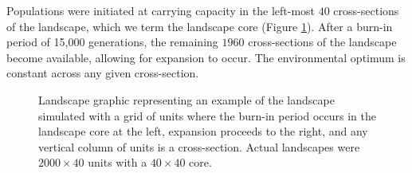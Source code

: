 
Populations were initiated at carrying capacity in the left-most $40$ cross-sections of the landscape, which we term the landscape core (Figure \ref{fig:landscape}). After a burn-in period of 15,000 generations, the remaining $1960$ cross-sections of the landscape become available, allowing for expansion to occur. The environmental optimum is constant across any given cross-section.

\begin{figure}[h]
\centering
{}
\caption[Landscape graphic.]{Landscape graphic representing an example of the landscape simulated with a grid of units where the burn-in period occurs in the landscape core at the left, expansion proceeds to the right, and any vertical column of units is a cross-section. Actual landscapes were $2000\times40$ units with a $40\times40$ core.}
\label{fig:landscape}
\end{figure}



